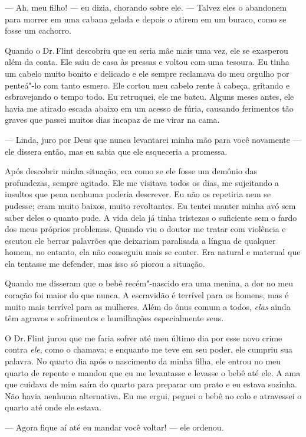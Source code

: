 --- Ah, meu filho! --- eu dizia, chorando sobre ele. --- Talvez eles o
abandonem para morrer em uma cabana gelada e depois o atirem em um
buraco, como se fosse um cachorro.

Quando o Dr.\,Flint descobriu que eu
seria mãe mais uma vez, ele se exasperou além da conta. Ele saiu de casa
às pressas e voltou com uma tesoura. Eu tinha um cabelo muito bonito e
delicado e ele sempre reclamava do meu orgulho por penteá"-lo com tanto
esmero. Ele cortou meu cabelo rente à cabeça, gritando e esbravejando o
tempo todo. Eu retruquei, ele me bateu. Alguns meses antes, ele havia me
atirado escada abaixo em um acesso de fúria, causando ferimentos tão
graves que passei muitos dias incapaz de me virar na cama.

--- Linda, juro por Deus que nunca levantarei minha mão para você
novamente --- ele dissera então, mas eu sabia que ele esqueceria a
promessa.

Após descobrir minha situação, era como
se ele fosse um demônio das profundezas, sempre agitado. Ele me visitava
todos os dias, me sujeitando a insultos que pena nenhuma poderia
descrever. Eu não os repetiria nem se pudesse; eram muito baixos, muito
revoltantes. Eu tentei manter minha avó sem saber deles o quanto pude. A
vida dela já tinha tristezas o suficiente sem o fardo dos meus próprios
problemas. Quando viu o doutor me tratar com violência e escutou ele
berrar palavrões que deixariam paralisada a língua de qualquer homem, no
entanto, ela não conseguiu mais se conter. Era natural e maternal que
ela tentasse me defender, mas isso só piorou a situação.

Quando me disseram que o bebê
recém"-nascido era uma menina, a dor no meu coração foi maior do que
nunca. A escravidão é terrível para os homens, mas é muito mais terrível
para as mulheres. Além do ônus comum a todos, \emph{elas} ainda têm
agravos e sofrimentos e humilhações especialmente seus.

O Dr.\,Flint jurou que me faria sofrer
até meu último dia por esse novo crime contra \emph{ele}, como o
chamava; e enquanto me teve em seu poder, ele cumpriu sua palavra. No
quarto dia após o nascimento da minha filha, ele entrou no meu quarto de
repente e mandou que eu me levantasse e levasse o bebê até ele. A ama
que cuidava de mim saíra do quarto para preparar um prato e eu estava
sozinha. Não havia nenhuma alternativa. Eu me ergui, peguei o bebê no
colo e atravessei o quarto até onde ele estava.

--- Agora fique aí até eu mandar você voltar! --- ele ordenou.

